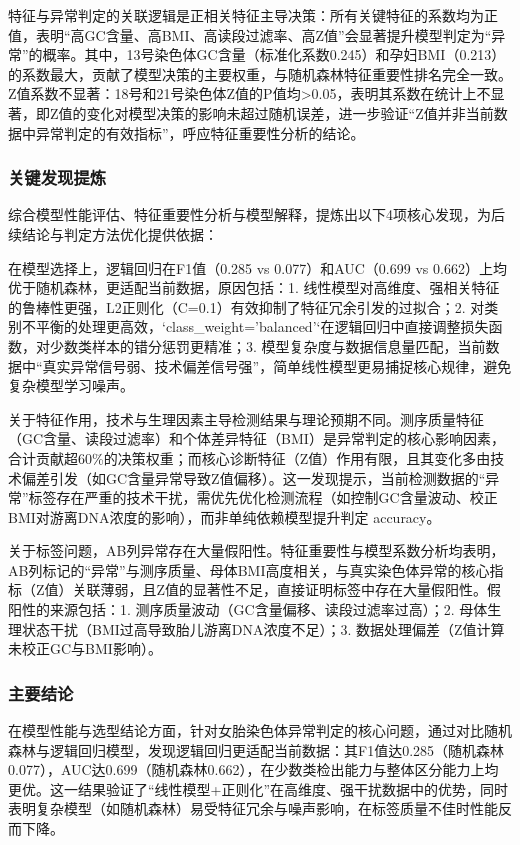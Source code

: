 \documentclass[withoutpreface,bwprint]{cumcmthesis} %
\begin{document}
特征与异常判定的关联逻辑是正相关特征主导决策：所有关键特征的系数均为正值，表明“高GC含量、高BMI、高读段过滤率、高Z值”会显著提升模型判定为“异常”的概率。其中，13号染色体GC含量（标准化系数0.245）和孕妇BMI（0.213）的系数最大，贡献了模型决策的主要权重，与随机森林特征重要性排名完全一致。Z值系数不显著：18号和21号染色体Z值的P值均>0.05，表明其系数在统计上不显著，即Z值的变化对模型决策的影响未超过随机误差，进一步验证“Z值并非当前数据中异常判定的有效指标”，呼应特征重要性分析的结论。

\subsubsection{关键发现提炼}
综合模型性能评估、特征重要性分析与模型解释，提炼出以下4项核心发现，为后续结论与判定方法优化提供依据：

在模型选择上，逻辑回归在F1值（0.285 vs 0.077）和AUC（0.699 vs 0.662）上均优于随机森林，更适配当前数据，原因包括：1. 线性模型对高维度、强相关特征的鲁棒性更强，L2正则化（C=0.1）有效抑制了特征冗余引发的过拟合；2. 对类别不平衡的处理更高效，`class\_weight='balanced'`在逻辑回归中直接调整损失函数，对少数类样本的错分惩罚更精准；3. 模型复杂度与数据信息量匹配，当前数据中“真实异常信号弱、技术偏差信号强”，简单线性模型更易捕捉核心规律，避免复杂模型学习噪声。

关于特征作用，技术与生理因素主导检测结果与理论预期不同。测序质量特征（GC含量、读段过滤率）和个体差异特征（BMI）是异常判定的核心影响因素，合计贡献超60\%的决策权重；而核心诊断特征（Z值）作用有限，且其变化多由技术偏差引发（如GC含量异常导致Z值偏移）。这一发现提示，当前检测数据的“异常”标签存在严重的技术干扰，需优先优化检测流程（如控制GC含量波动、校正BMI对游离DNA浓度的影响），而非单纯依赖模型提升判定 accuracy。

关于标签问题，AB列异常存在大量假阳性。特征重要性与模型系数分析均表明，AB列标记的“异常”与测序质量、母体BMI高度相关，与真实染色体异常的核心指标（Z值）关联薄弱，且Z值的显著性不足，直接证明标签中存在大量假阳性。假阳性的来源包括：1. 测序质量波动（GC含量偏移、读段过滤率过高）；2. 母体生理状态干扰（BMI过高导致胎儿游离DNA浓度不足）；3. 数据处理偏差（Z值计算未校正GC与BMI影响）。

\subsubsection{主要结论}
在模型性能与选型结论方面，针对女胎染色体异常判定的核心问题，通过对比随机森林与逻辑回归模型，发现逻辑回归更适配当前数据：其F1值达0.285（随机森林0.077），AUC达0.699（随机森林0.662），在少数类检出能力与整体区分能力上均更优。这一结果验证了“线性模型+正则化”在高维度、强干扰数据中的优势，同时表明复杂模型（如随机森林）易受特征冗余与噪声影响，在标签质量不佳时性能反而下降。
\end{document}
